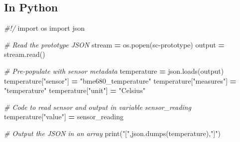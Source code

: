 \documentclass[
]{book}
\newenvironment{Shaded}{\begin{snugshade}}{\end{snugshade}}
\newcommand{\AttributeTok}[1]{\textcolor[rgb]{0.13,0.29,0.53}{#1}}
\newcommand{\BuiltInTok}[1]{#1}
\newcommand{\CommentTok}[1]{\textcolor[rgb]{0.56,0.35,0.01}{\textit{#1}}}
\newcommand{\DataTypeTok}[1]{\textcolor[rgb]{0.13,0.29,0.53}{#1}}
\newcommand{\ExtensionTok}[1]{#1}
\newcommand{\ImportTok}[1]{#1}
\newcommand{\KeywordTok}[1]{\textcolor[rgb]{0.13,0.29,0.53}{\textbf{#1}}}
\newcommand{\NormalTok}[1]{#1}
\newcommand{\OperatorTok}[1]{\textcolor[rgb]{0.81,0.36,0.00}{\textbf{#1}}}
\newcommand{\StringTok}[1]{\textcolor[rgb]{0.31,0.60,0.02}{#1}}
\newcommand{\VariableTok}[1]{\textcolor[rgb]{0.00,0.00,0.00}{#1}}
\begin{document}
\begin{Shaded}
\end{Shaded}

\subsection{In Python}\label{in-python}

\begin{Shaded}
\begin{Highlighting}[]
\CommentTok{\#!/}
\ImportTok{import}\NormalTok{ os}
\ImportTok{import}\NormalTok{ json}

\CommentTok{\# Read the prototype JSON}
\NormalTok{stream }\OperatorTok{=}\NormalTok{ os.popen(}\StringTok{\textquotesingle{}sc{-}prototype\textquotesingle{}}\NormalTok{)}
\NormalTok{output }\OperatorTok{=}\NormalTok{ stream.read()}

\CommentTok{\# Pre{-}populate with sensor metadata}
\NormalTok{temperature }\OperatorTok{=}\NormalTok{ json.loads(output)}
\NormalTok{temperature[}\StringTok{"sensor"}\NormalTok{] }\OperatorTok{=} \StringTok{"bme680\_temperature"}
\NormalTok{temperature[}\StringTok{"measures"}\NormalTok{] }\OperatorTok{=} \StringTok{"temperature"}
\NormalTok{temperature[}\StringTok{"unit"}\NormalTok{] }\OperatorTok{=} \StringTok{"Celsius"}

\CommentTok{\# Code to read sensor and output in variable \textasciigrave{}sensor\_reading\textasciigrave{}}
\NormalTok{temperature[}\StringTok{"value"}\NormalTok{] }\OperatorTok{=}\NormalTok{ sensor\_reading}

\CommentTok{\# Output the JSON in an array}
\BuiltInTok{print}\NormalTok{(}\StringTok{"["}\NormalTok{,json.dumps(temperature),}\StringTok{"]"}\NormalTok{)}
\end{Highlighting}
\end{Shaded}
\end{document}
